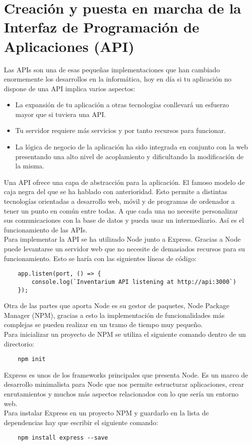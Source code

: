 \section{Creación y puesta en marcha de la Interfaz de Programación de Aplicaciones (API)}
Las APIs son una de esas pequeñas implementaciones que han cambiado enormemente los desarrollos en la informática, hoy en día si tu aplicación no dispone de una API implica varios aspectos:

\begin{itemize}
    \item La expansión de tu aplicación a otras tecnologías conllevará un esfuerzo mayor que si tuviera una API.
    \item Tu servidor requiere más servicios y por tanto recursos para funcionar.
    \item La lógica de negocio de la aplicación ha sido integrada en conjunto con la web presentando una alto nivel de acoplamiento y dificultando la modificación de la misma.
\end{itemize}

Una API ofrece una capa de abstracción para la aplicación. El famoso modelo de caja negra del que se ha hablado con anterioridad. Esto permite a distintas tecnologías orientadas a desarrollo web, móvil y de programas de ordenador a tener un punto en común entre todas. A que cada una no necesite personalizar sus comunicaciones con la base de datos y pueda usar un intermediario. Así es el funcionamiento de las APIs.
\\Para implementar la API se ha utilizado Node junto a Express. Gracias a Node puede levantarse un servidor web que no necesite de demasiados recursos para su funcionamiento. Esto se haría con las siguientes líneas de código:
\begin{verbatim}
    app.listen(port, () => {
        console.log(`Inventarium API listening at http://api:3000`)
    });
\end{verbatim}
Otra de las partes que aporta Node es su gestor de paquetes, Node Package Manager (NPM), gracias a esto la implementación de funcionalidades más complejas se pueden realizar en un tramo de tiempo muy pequeño.
\\Para inicializar un proyecto de NPM se utiliza el siguiente comando dentro de un directorio:
\begin{verbatim}
    npm init
\end{verbatim}

Express es unos de los frameworks principales que presenta Node. Es un marco de desarrollo minimalista para Node que nos permite estructurar aplicaciones, crear enrutamientos y muchos más aspectos relacionados con lo que sería un entorno web.
\\Para instalar Express en un proyecto NPM y guardarlo en la lista de dependencias hay que escribir el siguiente comando:
\begin{verbatim}
    npm install express --save
\end{verbatim}

